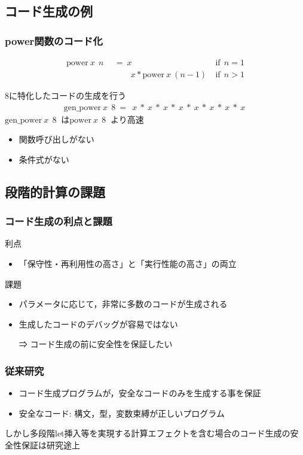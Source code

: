 \documentclass[dvipdfmx,cjk,xcolor=dvipsnames,envcountsect,notheorems,12pt]{beamer}
\theoremstyle{definition}
\begin{document}
\subsection{コード生成の例}
\begin{frame}
  \frametitle{power関数のコード化}
  \begin{align*}
    \text{power} ~x~ ~n~ &~=~ x &\text{if} ~~n = 1 \\
                         &~~~\phantom{=}~ x * \text{power} ~x~ (n-1)~ &\text{if} ~~n > 1
  \end{align*}

  \pause
  8に特化したコードの生成を行う
  \begin{align*}
    \text{gen\_power} ~x~ ~8~ =~ ~x~ * ~x~ * ~x~ * ~x~ * ~x~ * ~x~ * ~x~ * ~x~
  \end{align*}
  \pause
  $\text{gen\_power} ~x~ ~8~$ は$\text{power} ~x~ ~8~$ より高速
  \begin{itemize}
  \item 関数呼び出しがない
  \item 条件式がない
  \end{itemize}
\end{frame}

\subsection{段階的計算の課題}

\begin{frame}
  \frametitle{コード生成の利点と課題}

  利点
  \begin{itemize}
  \item 「保守性・再利用性の高さ」と「実行性能の高さ」の両立
  \end{itemize}

  \pause

  課題
  \begin{itemize}
  \item パラメータに応じて，非常に多数のコードが生成される
  \item 生成したコードのデバッグが容易ではない
  \item [⇒]コード生成の前に安全性を保証したい
  \end{itemize}
\end{frame}

\begin{frame}
  \frametitle{従来研究}
  \begin{itemize}
  \item コード生成プログラムが，安全なコードのみを生成する事を保証
  \item 安全なコード: 構文，型，変数束縛が正しいプログラム
  \end{itemize}

  \pause

  しかし\alert{多段階let挿入}等を実現する\alert{計算エフェクトを含む場合のコード生成の安全性保証は研究途上}
\end{frame}
\end{document}
